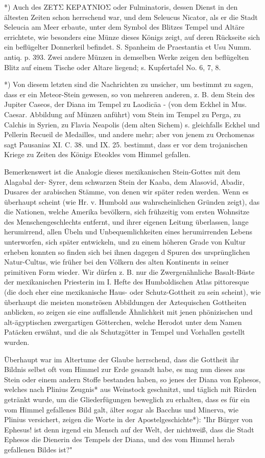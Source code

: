 \documentclass[a4paper, 11pt, oneside, polutonikogreek, german]{article}
\begin{document}
*) Auch des ΖΕΥΣ ΚΕΡΑΥNIOΣ oder Fulminatoris, dessen Dienst in den ältesten Zeiten schon herrschend war, und dem Seleucus Nicator, als er die Stadt Seleucia am Meer erbaute, unter dem Symbol des Blitzes Tempel und Altäre errichtete, wie besonders eine Münze dieses Königs zeigt, auf deren Rückseite sich ein beflügelter Donnerkeil befindet. S. Spanheim de Praestantia et Usu Numm. antiq. p. 393. Zwei andere Münzen in demselben Werke zeigen den beflügelten Blitz auf einem Tische oder Altare liegend; s. Kupfertafel No. 6, 7, 8.

*) Von diesem letzten sind die Nachrichten zu unsicher, um bestimmt zu sagen, dass er ein Meteor-Stein gewesen, so von mehreren anderen, z. B. dem Stein des Jupiter Caseos, der Diana im Tempel zu Laodicäa - (von dem Eckhel in Mus. Caesar. Abbildung auf Münzen anführt) vom Stein im Tempel zu Perga, zu Calchis in Syrien, zu Flavia Neapolis (dem alten Sichem) s. gleichfalls Eckhel und Pellerin Recueil de Medailles, und andere mehr; aber von jenem zu Orchomenas sagt Pausanias XI. C. 38. und IX. 25. bestimmt, dass er vor dem trojanischen Kriege zu Zeiten des Königs Eteokles vom Himmel gefallen.

Bemerkenswert ist die Analogie dieses mexikanischen Stein-Gottes mit dem Alagabal der- Syrer, dem schwarzen Stein der Kaaba, dem Alasovid, Abadir, Dusares der arabischen Stämme, von denen wir später reden werden. Wenn es überhaupt scheint (wie Hr. v. Humbold aus wahrscheinlichen Gründen zeigt), das die Nationen, welche Amerika bevölkern, sich frühzeitig vom ersten Wohnsitze des Menschengeschlechts entfernt, und ihrer eigenen Leitung überlassen, lange herumirrend, allen Übeln und Unbequemlichkeiten eines herumirrenden Lebens unterworfen, sich später entwickeln, und zu einem höheren Grade von Kultur erheben konnten so finden sich bei ihnen dagegen d Spuren des ursprünglichen Natur-Cultus, wie früher bei den Völkern des alten Kontinents in seiner primitiven Form wieder. Wir dürfen z. B. nur die Zwergenähnliche Basalt-Büste der mexikanischen Priesterin im I. Hefte des Humboldischen Atlas pittoresque (die doch eher eine mexikanische Haus- oder Schutz-Gottheit zu sein scheint), wie überhaupt die meisten monströsen Abbildungen der Aztequischen Gottheiten anblicken, so zeigen sie eine auffallende Ähnlichkeit mit jenen phönizischen und alt-ägyptischen zwergartigen Götterchen, welche Herodot unter dem Namen Patäcken erwähnt, und die als Schutzgötter in Tempel und Vorhallen gestellt wurden.

Überhaupt war im Altertume der Glaube herrschend, dass die Gottheit ihr Bildnis selbst oft vom Himmel zur Erde gesandt habe, es mag nun dieses aus Stein oder einem andern Stoffe bestanden haben, so jenes der Diana von Ephesos, welches nach Plinius Zeugnis* aus Weinstock geschnitzt, und täglich mit Rürden getränkt wurde, um die Gliederfügungen beweglich zu erhalten, dass es für ein vom Himmel gefallenes Bild galt, älter sogar als Bacchus und Minerva, wie Plinius versichert, zeigen die Worte in der Apostelgeschichte*): "Ihr Bürger von Ephesus! ist denn irgend ein Mensch auf der Welt, der nichtweiß, dass die Stadt Ephesos die Dienerin des Tempels der Diana, und des vom Himmel herab gefallenen Bildes ist?"
\end{document}
